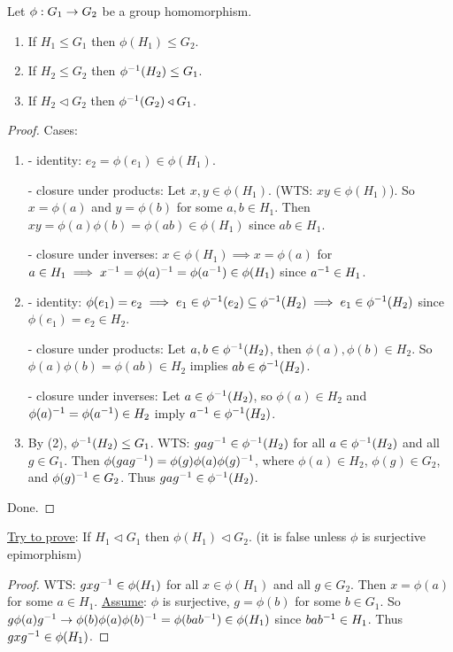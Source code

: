 \documentclass[]{article}
\begin{document}
\begin{theorem}
	Let $\phi:G_1\rightarrow G_2$ be a group homomorphism.
	\begin{enumerate}
		\item If $H_1\leq G_1$ then $\phi(H_1) \leq G_2$.
		\item If $H_2\leq G_2$ then $\phi^{-1}(H_2)\leq G_1$.
		\item If $H_2\triangleleft G_2$ then $\phi^{-1}(G_2)\triangleleft G_1$.
	\end{enumerate}
\end{theorem}
\begin{proof}
	Cases:
	\begin{enumerate}
		\item - identity: $e_2 = \phi(e_1)\in\phi(H_1)$.

			- closure under products: Let $x,y\in\phi(H_1)$. (WTS: $xy\in\phi(H_1)$).
			So $x = \phi(a)$ and $y = \phi(b)$ for some $a,b\in H_1$. Then $xy = \phi(a)\phi(b) = \phi(ab)\in\phi(H_1)$ since $ab\in H_1$.

			- closure under inverses: $x\in \phi(H_1)\implies x = \phi(a)$ for $a\in H_1 \implies x^{-1} = \phi(a)^{-1} = \phi(a^{-1})\in\phi(H_1)$ since $a^{-1}\in H_1$.
		\item - identity: $\phi(e_1) = e_2 \implies e_1\in\phi^{-1}(e_2) \subseteq \phi^{-1}(H_2) \implies e_1\in\phi^{-1}(H_2)$ since $\phi(e_1) = e_2\in H_2$.

			- closure under products: Let $a,b\in\phi^{-1}(H_2)$, then $\phi(a),\phi(b)\in H_2$. So $\phi(a)\phi(b) = \phi(ab)\in H_2$ implies $ab\in\phi^{-1}(H_2)$.

			- closure under inverses: Let $a\in\phi^{-1}(H_2)$, so $\phi(a)\in H_2$ and $\phi(a)^{-1} = \phi(a^{-1})\in H_2$ imply $a^{-1}\in\phi^{-1}(H_2)$.
		\item By (2), $\phi^{-1}(H_2)\leq G_1$. WTS: $gag^{-1}\in\phi^{-1}(H_2)$ for all $a\in\phi^{-1}(H_2)$ and all $g\in G_1$.
			Then $\phi(gag^{-1}) = \phi(g)\phi(a)\phi(g)^{-1}$, where $\phi(a)\in H_2$, $\phi(g)\in G_2$, and $\phi(g)^{-1}\in G_2$. Thus $gag^{-1}\in\phi^{-1}(H_2)$.
	\end{enumerate}
	Done.
\end{proof}
\begin{example}
	\ul{Try to prove}: If $H_1\triangleleft G_1$ then $\phi(H_1)\triangleleft G_2$. (it is false unless $\phi$ is surjective epimorphism)
\end{example}
\begin{proof}
	WTS: $gxg^{-1}\in\phi(H_1)$ for all $x\in\phi(H_1)$ and all $g\in G_2$.
	Then $x = \phi(a)$ for some $a\in H_1$.
	\ul{Assume}: $\phi$ is surjective, $g = \phi(b)$ for some $b\in G_1$.
	So $g\phi(a)g^{-1} \rightarrow \phi(b)\phi(a)\phi(b)^{-1} = \phi(bab^{-1})\in\phi(H_1)$ since $bab^{-1}\in H_1$.
	Thus $gxg^{-1}\in\phi(H_1)$.
\end{proof}
\end{document}
